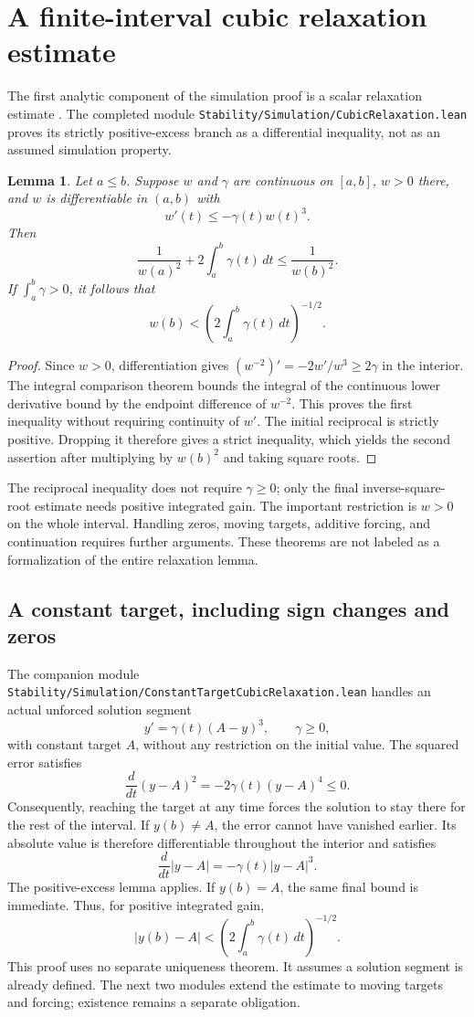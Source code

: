 \documentclass[11pt]{article}
\newtheorem{lemma}[theorem]{Lemma}
\newcommand{\code}[1]{{\small\nolinkurl{#1}}}
\begin{document}
\section{A finite-interval cubic relaxation estimate}

The first analytic component of the simulation proof is a scalar
relaxation estimate \cite[Lemma 4.1]{korda}. The completed module
\code{Stability/Simulation/CubicRelaxation.lean} proves its strictly
positive-excess branch as a differential inequality, not as an assumed
simulation property.

\begin{lemma}
Let $a\le b$. Suppose $w$ and $\gamma$ are continuous on $[a,b]$, $w>0$
there, and $w$ is differentiable in $(a,b)$ with
\[
 w'(t)\le-\gamma(t)w(t)^3.
\]
Then
\[
 \frac1{w(a)^2}+2\int_a^b\gamma(t)\,dt\le\frac1{w(b)^2}.
\]
If $\int_a^b\gamma>0$, it follows that
\[
 w(b)<\left(2\int_a^b\gamma(t)\,dt\right)^{-1/2}.
\]
\end{lemma}

\begin{proof}
Since $w>0$, differentiation gives
$(w^{-2})'=-2w'/w^3\ge2\gamma$ in the interior. The integral comparison
theorem bounds the integral of the continuous lower derivative bound by
the endpoint difference of $w^{-2}$. This proves the first inequality
without requiring continuity of $w'$. The initial reciprocal is strictly
positive. Dropping it therefore gives a strict inequality, which yields
the second assertion after multiplying by $w(b)^2$ and taking square roots.
\end{proof}

The reciprocal inequality does not require $\gamma\ge0$; only the final
inverse-square-root estimate needs positive integrated gain. The important
restriction is $w>0$ on the whole interval. Handling zeros, moving targets,
additive forcing, and continuation requires further arguments. These
theorems are not labeled as a formalization of the entire relaxation lemma.

\subsection{A constant target, including sign changes and zeros}

The companion module
\code{Stability/Simulation/ConstantTargetCubicRelaxation.lean} handles an
actual unforced solution segment
\[
 y'=\gamma(t)(A-y)^3,\qquad \gamma\ge0,
\]
with constant target $A$, without any restriction on the initial value.
The squared error satisfies
\[
 \frac{d}{dt}(y-A)^2=-2\gamma(t)(y-A)^4\le0.
\]
Consequently, reaching the target at any time forces the solution to stay
there for the rest of the interval. If $y(b)\ne A$, the error cannot have
vanished earlier. Its absolute value is therefore differentiable throughout
the interior and satisfies
\[
 \frac{d}{dt}|y-A|=-\gamma(t)|y-A|^3.
\]
The positive-excess lemma applies. If $y(b)=A$, the same final bound is
immediate. Thus, for positive integrated gain,
\[
 |y(b)-A|<\left(2\int_a^b\gamma(t)\,dt\right)^{-1/2}.
\]
This proof uses no separate uniqueness theorem. It assumes a solution
segment is already defined. The next two modules extend the estimate to
moving targets and forcing; existence remains a separate obligation.
\end{document}
